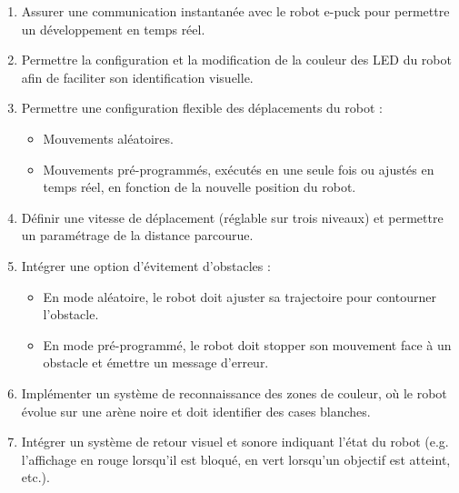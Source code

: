 \begin{enumerate}
    \item Assurer une communication instantanée avec le robot e-puck pour permettre un développement en temps réel.
    
    \item Permettre la configuration et la modification de la couleur des LED du robot afin de faciliter son identification visuelle.

    \item Permettre une configuration flexible des déplacements du robot :  
        \begin{itemize}
            \item Mouvements aléatoires.  
            \item Mouvements pré-programmés, exécutés en une seule fois ou ajustés en temps réel, en fonction de la nouvelle position du robot.  
        \end{itemize}  

    \item Définir une vitesse de déplacement (réglable sur trois niveaux) et permettre un paramétrage de la distance parcourue.  

    \item Intégrer une option d’évitement d’obstacles :  
        \begin{itemize}
            \item En mode aléatoire, le robot doit ajuster sa trajectoire pour contourner l’obstacle.  
            \item En mode pré-programmé, le robot doit stopper son mouvement face à un obstacle et émettre un message d'erreur.  
        \end{itemize}  

    \item Implémenter un système de reconnaissance des zones de couleur, où le robot évolue sur une arène noire et doit identifier des cases blanches.

    \item Intégrer un système de retour visuel et sonore indiquant l’état du robot (e.g. l'affichage en rouge lorsqu’il est bloqué, en vert lorsqu’un objectif est atteint, etc.). 
\end{enumerate}  
